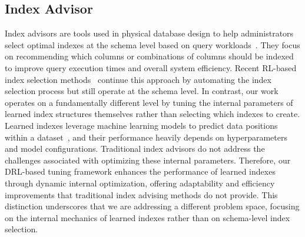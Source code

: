 \subsection{Index Advisor}
Index advisors are tools used in physical database design to help administrators select optimal indexes at the schema level based on query workloads~\cite{chaudhuri1997efficient, valentin2000db2}. They focus on recommending which columns or combinations of columns should be indexed to improve query execution times and overall system efficiency. Recent RL-based index selection methods~\cite{kossmann2022swirl, zhou2024breaking, siddiqui2024ml, wang2024leveraging} continue this approach by automating the index selection process but still operate at the schema level. In contrast, our work operates on a fundamentally different level by tuning the internal parameters of learned index structures themselves rather than selecting which indexes to create. Learned indexes leverage machine learning models to predict data positions within a dataset~\cite{kraska2018case}, and their performance heavily depends on hyperparameters and model configurations. Traditional index advisors do not address the challenges associated with optimizing these internal parameters. Therefore, our DRL-based tuning framework enhances the performance of learned indexes through dynamic internal optimization, offering adaptability and efficiency improvements that traditional index advising methods do not provide. This distinction underscores that we are addressing a different problem space, focusing on the internal mechanics of learned indexes rather than on schema-level index selection.



%